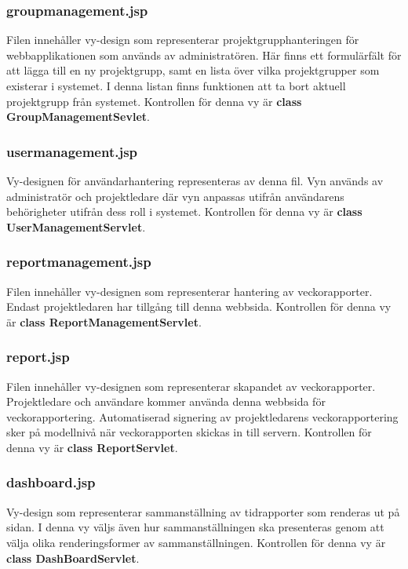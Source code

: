 \documentclass[paper=a4, fontsize=11pt,twoside]{article}
\begin{document}
\subsubsection{groupmanagement.jsp}
Filen innehåller vy-design som representerar projektgrupphanteringen för webbapplikationen som används av administratören. Här finns ett formulärfält för att lägga till en ny projektgrupp, samt en lista över vilka projektgrupper som existerar  i systemet. I denna listan finns funktionen att ta bort aktuell projektgrupp från systemet. Kontrollen för denna vy är \textbf{class GroupManagementSevlet}.

\subsubsection{usermanagement.jsp}
Vy-designen för användarhantering representeras av denna fil. Vyn används av administratör och projektledare där vyn anpassas utifrån användarens behörigheter utifrån dess roll i systemet. Kontrollen för denna vy är \textbf{class UserManagementServlet}.

\subsubsection{reportmanagement.jsp}
Filen innehåller vy-designen som representerar hantering av veckorapporter. Endast projektledaren har tillgång till denna webbsida. Kontrollen för denna vy är \textbf{class ReportManagementServlet}.

\subsubsection{report.jsp}
Filen innehåller vy-designen som representerar skapandet av veckorapporter. Projektledare och användare kommer använda denna webbsida för veckorapportering. Automatiserad signering av projektledarens veckorapportering sker på modellnivå när veckorapporten skickas in till servern. Kontrollen för denna vy är \textbf{class ReportServlet}.

\subsubsection{dashboard.jsp}	
Vy-design som representerar sammanställning av tidrapporter som renderas ut på sidan. I denna vy väljs även hur sammanställningen ska presenteras genom att välja olika renderingsformer av sammanställningen. Kontrollen för denna vy är \textbf{class DashBoardServlet}.
\end{document}
